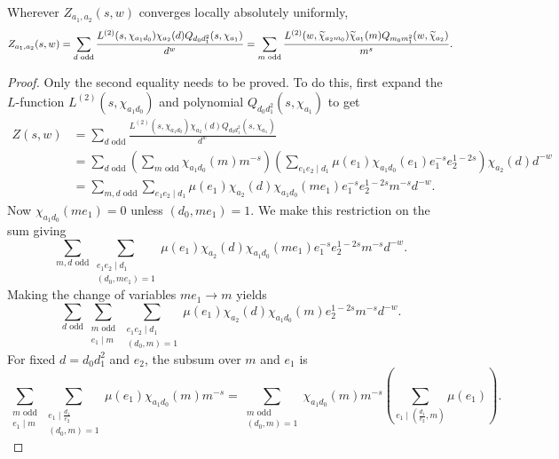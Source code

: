 \documentclass[12pt,reqno,oneside]{amsart}
\begin{document}
    \begin{theorem}[Interchange]
        Wherever $Z_{a_{1},a_{2}}(s,w)$ converges locally absolutely uniformly,
        \[
            Z_{a_{1},a_{2}}(s,w) = \sum_{\text{$d$ odd}}\frac{L^{(2)}(s,\chi_{a_{1}d_{0}})\chi_{a_{2}}(d)Q_{d_{0}d_{1}^{2}}(s,\chi_{a_{1}})}{d^{w}} = \sum_{\text{$m$ odd}}\frac{L^{(2)}(w,\widetilde{\chi}_{a_{2}m_{0}})\widetilde{\chi}_{a_{1}}(m)Q_{m_{0}m_{1}^{2}}(w,\widetilde{\chi}_{a_{2}})}{m^{s}}.
        \]
    \end{theorem}
    \begin{proof}
        Only the second equality needs to be proved. To do this, first expand the $L$-function $L^{(2)}(s,\chi_{a_{1}d_{0}})$ and polynomial $Q_{d_{0}d_{1}^{2}}(s,\chi_{a_{1}})$ to get
        \begin{align*}
            Z(s,w) &= \sum_{\text{$d$ odd}}\frac{L^{(2)}(s,\chi_{a_{1}d_{0}})\chi_{a_{2}}(d)Q_{d_{0}d_{1}^{2}}(s,\chi_{a_{1}})}{d^{w}} \\
            &= \sum_{\text{$d$ odd}}\left(\sum_{\text{$m$ odd}}\chi_{a_{1}d_{0}}(m)m^{-s}\right)\left(\sum_{e_{1}e_{2} \mid d_{1}}\mu(e_{1})\chi_{a_{1}d_{0}}(e_{1})e_{1}^{-s}e_{2}^{1-2s}\right)\chi_{a_{2}}(d)d^{-w} \\
            &= \sum_{\text{$m,d$ odd}}\sum_{e_{1}e_{2} \mid d_{1}}\mu(e_{1})\chi_{a_{2}}(d)\chi_{a_{1}d_{0}}(me_{1})e_{1}^{-s}e_{2}^{1-2s}m^{-s}d^{-w}.
        \end{align*}
        Now $\chi_{a_{1}d_{0}}(me_{1}) = 0$ unless $(d_{0},me_{1}) = 1$. We make this restriction on the sum giving
        \[
            \sum_{\text{$m,d$ odd}}\sum_{\substack{e_{1}e_{2} \mid d_{1} \\ (d_{0},me_{1}) = 1}}\mu(e_{1})\chi_{a_{2}}(d)\chi_{a_{1}d_{0}}(me_{1})e_{1}^{-s}e_{2}^{1-2s}m^{-s}d^{-w}.
        \]
        Making the change of variables $me_{1} \to m$ yields
        \[
            \sum_{\text{$d$ odd}}\sum_{\substack{\text{$m$ odd} \\ e_{1} \mid m}}\sum_{\substack{e_{1}e_{2} \mid d_{1} \\ (d_{0},m) = 1}}\mu(e_{1})\chi_{a_{2}}(d)\chi_{a_{1}d_{0}}(m)e_{2}^{1-2s}m^{-s}d^{-w}.
        \]
        For fixed $d = d_{0}d_{1}^{2}$ and $e_{2}$, the subsum over $m$ and $e_{1}$ is
        \[
            \sum_{\substack{\text{$m$ odd} \\ e_{1} \mid m}}\sum_{\substack{e_{1} \mid \frac{d_{1}}{e_{2}} \\ (d_{0},m) = 1}}\mu(e_{1})\chi_{a_{1}d_{0}}(m)m^{-s} = \sum_{\substack{\text{$m$ odd} \\ (d_{0},m) = 1}}\chi_{a_{1}d_{0}}(m)m^{-s}\left(\sum_{e_{1} \mid \left(\frac{d_{1}}{e_{2}},m\right)}\mu(e_{1})\right).
\]
\end{proof}
\end{document}
